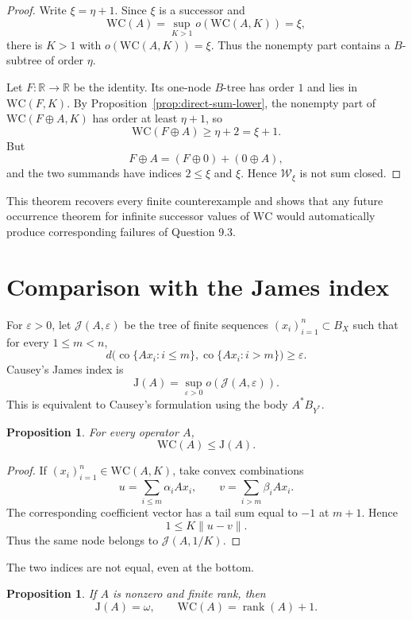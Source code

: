 \documentclass[11pt]{article}
\newtheorem{proposition}[theorem]{Proposition}
\theoremstyle{definition}
\theoremstyle{remark}
\newcommand{\WC}{\mathrm{WC}}
\newcommand{\J}{\mathrm{J}}
\newcommand{\rank}{\operatorname{rank}}
\newcommand{\co}{\operatorname{co}}
\newcommand{\eps}{\varepsilon}
\newcommand{\R}{\mathbb R}
\newcommand{\cW}{\mathcal W}
\newcommand{\cJ}{\mathcal J}
\begin{document}
\begin{proof}
Write $\xi=\eta+1$.  Since $\xi$ is a successor and
\[
   \WC(A)=\sup_{K>1}o(\WC(A,K))=\xi,
\]
there is $K>1$ with $o(\WC(A,K))=\xi$.  Thus the nonempty part contains a $B$-subtree of order $\eta$.

Let $F:\R\to\R$ be the identity.  Its one-node $B$-tree has order $1$ and lies in $\WC(F,K)$.  By Proposition~\ref{prop:direct-sum-lower}, the nonempty part of $\WC(F\oplus A,K)$ has order at least $\eta+1$, so
\[
   \WC(F\oplus A)\geq\eta+2=\xi+1.
\]
But
\[
   F\oplus A=(F\oplus0)+(0\oplus A),
\]
and the two summands have indices $2\leq\xi$ and $\xi$.  Hence $\cW_\xi$ is not sum closed.
\end{proof}

This theorem recovers every finite counterexample and shows that any future occurrence theorem for infinite successor values of $\WC$ would automatically produce corresponding failures of Question 9.3.

\section{Comparison with the James index}

For $\eps>0$, let $\cJ(A,\eps)$ be the tree of finite sequences $(x_i)_{i=1}^n\subset B_X$ such that for every $1\leq m<n$,
\[
  d\bigl(\co\{Ax_i:i\leq m\},\co\{Ax_i:i>m\}\bigr)\geq\eps.
\]
Causey's James index is
\[
   \J(A)=\sup_{\eps>0}o(\cJ(A,\eps)).
\]
This is equivalent to Causey's formulation using the body $A^*B_{Y^*}$.

\begin{proposition}\label{prop:WC-le-J}
For every operator $A$,
\[
   \WC(A)\leq\J(A).
\]
\end{proposition}

\begin{proof}
If $(x_i)_{i=1}^n\in\WC(A,K)$, take convex combinations
\[
   u=\sum_{i\leq m}\alpha_iAx_i,
   \qquad
   v=\sum_{i>m}\beta_iAx_i.
\]
The corresponding coefficient vector has a tail sum equal to $-1$ at $m+1$.  Hence
\[
   1\leq K\|u-v\|.
\]
Thus the same node belongs to $\cJ(A,1/K)$.
\end{proof}

The two indices are not equal, even at the bottom.

\begin{proposition}\label{prop:J-finite-rank}
If $A$ is nonzero and finite rank, then
\[
   \J(A)=\omega,
   \qquad
   \WC(A)=\rank(A)+1.
\]
\end{proposition}
\end{document}
